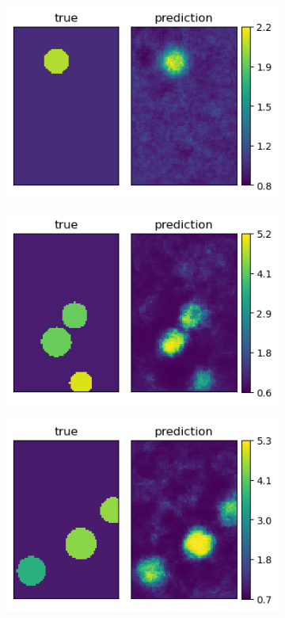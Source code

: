 \documentclass[12pt]{article}
\newcommand{\nhghalfwidth}{0.48\linewidth}
\newcommand{\nhgtotalheight}{4cm}
\begin{document}
\begin{figure}[!h]
  \centering
  \begin{subfigure}[c]{\nhghalfwidth}
    \centering
    \includegraphics[totalheight=\nhgtotalheight]{Figures/Results1/ex1/mu.png}
  \end{subfigure}
  \begin{subfigure}[c]{\nhghalfwidth}
    \centering
    \includegraphics[totalheight=\nhgtotalheight]{Figures/Results1/ex2/mu.png}
  \end{subfigure}
  \begin{subfigure}[c]{\nhghalfwidth}
    \centering
    \includegraphics[totalheight=\nhgtotalheight]{Figures/Results1/ex3/mu.png}

\end{subfigure}
\end{figure}
\end{document}
